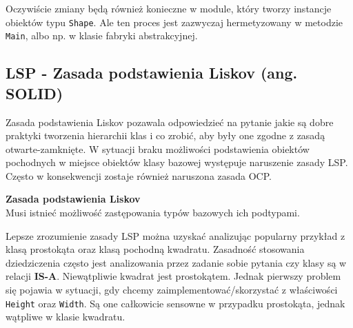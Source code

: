 

Oczywiście zmiany będą również konieczne w module, który tworzy instancje obiektów typu \texttt{Shape}. Ale ten proces jest zazwyczaj hermetyzowany w metodzie \texttt{Main}, albo np. w klasie fabryki abstrakcyjnej. 

\subsection{LSP - Zasada podstawienia Liskov (ang. SO\textbf{L}ID)}

Zasada podstawienia Liskov pozawala odpowiedzieć na pytanie jakie są dobre praktyki tworzenia hierarchii klas i co zrobić, aby były one zgodne z zasadą otwarte-zamknięte. W sytuacji braku możliwości podstawienia obiektów pochodnych w miejsce obiektów klasy bazowej występuje naruszenie zasady LSP. Często w konsekwencji zostaje również naruszona zasada OCP.

\begin{tcolorbox}[colback=yellow]	
\textbf{Zasada podstawienia Liskov}\\
Musi istnieć możliwość zastępowania typów bazowych ich podtypami.
\end{tcolorbox}

Lepsze zrozumienie zasady LSP można uzyskać analizując popularny przykład z klasą prostokąta oraz klasą pochodną kwadratu. Zasadność stosowania dziedziczenia często jest analizowania przez zadanie sobie pytania czy klasy są w relacji \textbf{IS-A}. Niewątpliwie kwadrat jest prostokątem. Jednak pierwszy problem się pojawia w sytuacji, gdy chcemy zaimplementować/skorzystać z właściwości \texttt{Height} oraz \texttt{Width}. Są one całkowicie sensowne w przypadku prostokąta, jednak wątpliwe w klasie kwadratu. 

